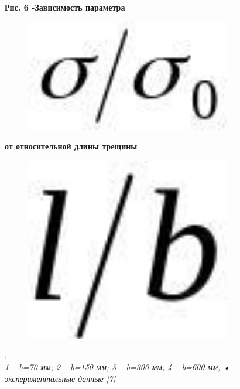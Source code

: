{\bfseries Рис. 6 -Зависимость параметра}
\begin{figure}[H]
	\centering
	\includegraphics[width=0.8\textwidth]{assets/1193}
	\caption*{}
\end{figure} {\bfseries от относительной длины
трещины} \begin{figure}[H]
	\centering
	\includegraphics[width=0.8\textwidth]{assets/1194}
	\caption*{}
\end{figure}:\\
\emph{1 -- b=70 мм; 2 -- b=150 мм; 3 -- b=300 мм; 4 -- b=600 мм; • -
экспериментальные данные} \emph{{[}7{]}}

